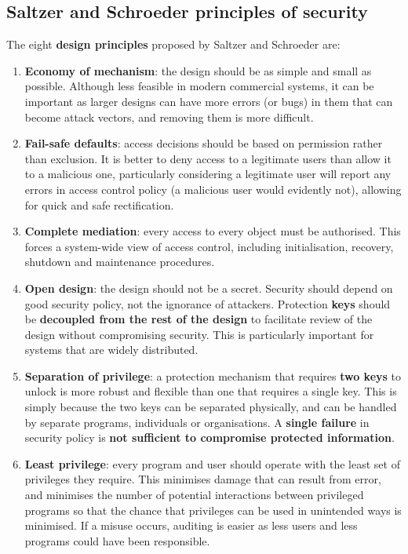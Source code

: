 \documentclass[final]{article}
\begin{document}
\subsection{Saltzer and Schroeder principles of security}
The eight \textbf{design principles} proposed by Saltzer and Schroeder are:
\begin{enumerate}
	\item \textbf{Economy of mechanism}: the design should be as simple and small as possible. Although less feasible in modern commercial systems, it can be important as larger designs can have more errors (or bugs) in them that can become attack vectors, and removing them is more difficult.
	\item \textbf{Fail-safe defaults}: access decisions should be based on permission rather than exclusion. It is better to deny access to a legitimate users than allow it to a malicious one, particularly considering a legitimate user will report any errors in access control policy (a malicious user would evidently not), allowing for quick and safe rectification.
	\item \textbf{Complete mediation}: every access to every object must be authorised. This forces a system-wide view of access control, including initialisation, recovery, shutdown and maintenance procedures.
	\item \textbf{Open design}: the design should not be a secret. Security should depend on good security policy, not the ignorance of attackers. Protection \textbf{keys} should be \textbf{decoupled from the rest of the design} to facilitate review of the design without compromising security. This is particularly important for systems that are widely distributed.
	\item \textbf{Separation of privilege}: a protection mechanism that requires \textbf{two keys} to unlock is more robust and flexible than one that requires a single key. This is simply because the two keys can be separated physically, and can be handled by separate programs, individuals or organisations. A \textbf{single failure} in security policy is \textbf{not sufficient to compromise protected information}.
	\item \textbf{Least privilege}: every program and user should operate with the least set of privileges they require. This minimises damage that can result from error, and minimises the number of potential interactions between privileged programs so that the chance that privileges can be used in unintended ways is minimised. If a misuse occurs, auditing is easier as less users and less programs could have been responsible.

\end{enumerate}
\end{document}
